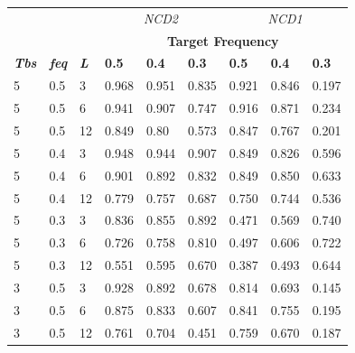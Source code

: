 \begin{refsection}
\begin{otherlanguage}{english}
\begin{scriptsize}
\begin{longtable}{lllllllll}
\multicolumn{3}{c}{} & \multicolumn{3}{c}{\cellcolor[HTML]{C0C0C0}\textit{NCD2}} & \multicolumn{3}{c}{\cellcolor[HTML]{C0C0C0}\textit{NCD1}} \\ \cline{4-9} 
\multicolumn{3}{c}{} & \multicolumn{6}{c}{\cellcolor[HTML]{9B9B9B}\textbf{Target Frequency}} \\
\cellcolor[HTML]{9B9B9B}\textit{\textbf{Tbs}} & \cellcolor[HTML]{9B9B9B}\textit{\textbf{feq}} & \cellcolor[HTML]{9B9B9B}\textit{\textbf{L}} & \textbf{0.5} & \textbf{0.4} & \textbf{0.3} & \textbf{0.5} & \textbf{0.4} & \textbf{0.3} \\
\cellcolor[HTML]{C0C0C0}5 & \cellcolor[HTML]{C0C0C0}0.5 & \cellcolor[HTML]{C0C0C0}3 & 0.968 & 0.951 & 0.835 & 0.921 & 0.846 & 0.197 \\
\cellcolor[HTML]{C0C0C0}5 & \cellcolor[HTML]{C0C0C0}0.5 & \cellcolor[HTML]{C0C0C0}6 & 0.941 & 0.907 & 0.747 & 0.916 & 0.871 & 0.234 \\
\cellcolor[HTML]{C0C0C0}5 & \cellcolor[HTML]{C0C0C0}0.5 & \cellcolor[HTML]{C0C0C0}12 & 0.849 & 0.80 & 0.573 & 0.847 & 0.767 & 0.201 \\
\cellcolor[HTML]{C0C0C0}5 & \cellcolor[HTML]{C0C0C0}0.4 & \cellcolor[HTML]{C0C0C0}3 & 0.948 & 0.944 & 0.907 & 0.849 & 0.826 & 0.596 \\
\cellcolor[HTML]{C0C0C0}5 & \cellcolor[HTML]{C0C0C0}0.4 & \cellcolor[HTML]{C0C0C0}6 & 0.901 & 0.892 & 0.832 & 0.849 & 0.850 & 0.633 \\
\cellcolor[HTML]{C0C0C0}5 & \cellcolor[HTML]{C0C0C0}0.4 & \cellcolor[HTML]{C0C0C0}12 & 0.779 & 0.757 & 0.687 & 0.750 & 0.744 & 0.536 \\
\cellcolor[HTML]{C0C0C0}5 & \cellcolor[HTML]{C0C0C0}0.3 & \cellcolor[HTML]{C0C0C0}3 & 0.836 & 0.855 & 0.892 & 0.471 & 0.569 & 0.740 \\
\cellcolor[HTML]{C0C0C0}5 & \cellcolor[HTML]{C0C0C0}0.3 & \cellcolor[HTML]{C0C0C0}6 & 0.726 & 0.758 & 0.810 & 0.497 & 0.606 & 0.722 \\
\cellcolor[HTML]{C0C0C0}5 & \cellcolor[HTML]{C0C0C0}0.3 & \cellcolor[HTML]{C0C0C0}12 & 0.551 & 0.595 & 0.670 & 0.387 & 0.493 & 0.644 \\
\cellcolor[HTML]{C0C0C0}3 & \cellcolor[HTML]{C0C0C0}0.5 & \cellcolor[HTML]{C0C0C0}3 & 0.928 & 0.892 & 0.678 & 0.814 & 0.693 & 0.145 \\
\cellcolor[HTML]{C0C0C0}3 & \cellcolor[HTML]{C0C0C0}0.5 & \cellcolor[HTML]{C0C0C0}6 & 0.875 & 0.833 & 0.607 & 0.841 & 0.755 & 0.195 \\
\cellcolor[HTML]{C0C0C0}3 & \cellcolor[HTML]{C0C0C0}0.5 & \cellcolor[HTML]{C0C0C0}12 & 0.761 & 0.704 & 0.451 & 0.759 & 0.670 & 0.187 \\

\end{longtable}
\end{scriptsize}
\end{otherlanguage}
\end{refsection}
